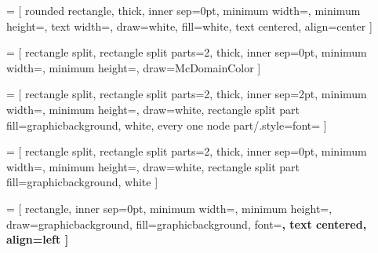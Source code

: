 \documentclass[tikz, table]{standalone}
\begin{document}
 = [
rounded rectangle,
thick,
inner sep=0pt,
minimum width=\MinNodeWidth,
minimum height=\MinNodeHigth,
text width=\NodeTextWidth,
draw=white,
fill=white,
text centered, 
align=center
]

 = [
rectangle split, 
rectangle split parts=2,
thick,
inner sep=0pt,
minimum width=\MinNodeWidth,
minimum height=\MinNodeHigth,
draw=McDomainColor
]

 = [
rectangle split, 
rectangle split parts=2,
thick,
inner sep=2pt,
minimum width=\MinNodeWidth,
minimum height=\MinNodeHigth,
draw=white,
rectangle split part fill={graphicbackground, white},
every one node part/.style={font=\LARGE\bf}
]

 = [
rectangle split, 
rectangle split parts=2,
thick,
inner sep=0pt,
minimum width=\MinNodeWidth,
minimum height=\MinNodeHigth,
draw=white,
rectangle split part fill={graphicbackground, white}
]

 = [
rectangle,
inner sep=0pt,
minimum width=\MinNodeWidth,
minimum height=\MinNodeHigth,
draw=graphicbackground, 
fill=graphicbackground,
font=\LARGE\bf,
text centered, 
align=left
]

\end{document}
